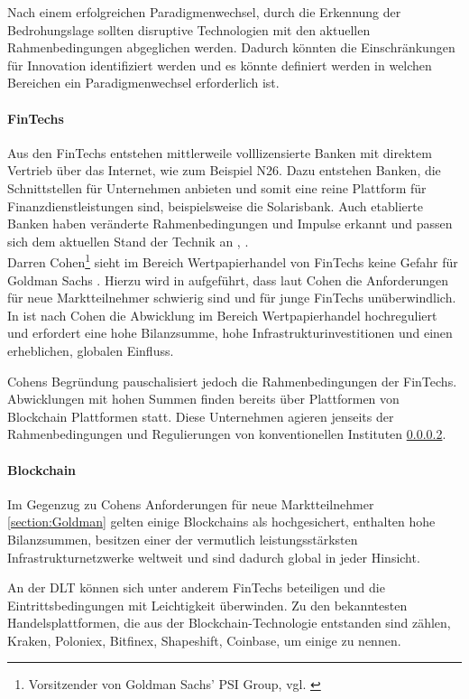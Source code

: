 Nach einem erfolgreichen Paradigmenwechsel, durch die Erkennung der Bedrohungslage sollten disruptive Technologien mit den aktuellen Rahmenbedingungen abgeglichen werden. Dadurch könnten die Einschränkungen für Innovation identifiziert werden und es könnte definiert werden in welchen Bereichen ein Paradigmenwechsel erforderlich ist.

\paragraph{FinTechs}
\label{Disruption:FinTechs}
Aus den FinTechs entstehen mittlerweile volllizensierte Banken mit direktem Vertrieb über das Internet, wie zum Beispiel N26. Dazu entstehen Banken, die Schnittstellen für Unternehmen anbieten und somit eine reine Plattform für Finanzdienstleistungen sind, beispielsweise die Solarisbank. Auch etablierte Banken haben veränderte Rahmenbedingungen und Impulse erkannt und passen sich dem aktuellen Stand der Technik an \cite{Gupta:2017}, \cite{Eismann2015}.
\medskip
\\
Darren Cohen\footnote{Vorsitzender von Goldman Sachs' PSI Group, vgl. \cite{Gupta:2017}} sieht im Bereich Wertpapierhandel von FinTechs keine Gefahr für Goldman Sachs \cite{Gupta:2017}.
Hierzu wird in \cite{Gupta:2017} aufgeführt, dass laut Cohen die Anforderungen für neue Marktteilnehmer schwierig sind und für junge FinTechs unüberwindlich. In \cite{Gupta:2017} ist nach Cohen die Abwicklung im Bereich Wertpapierhandel hochreguliert und erfordert eine hohe Bilanzsumme, hohe Infrastrukturinvestitionen und einen erheblichen, globalen Einfluss.

Cohens Begründung pauschalisiert jedoch die Rahmenbedingungen der FinTechs. Abwicklungen mit hohen Summen finden bereits über Plattformen von Blockchain Plattformen statt. Diese Unternehmen agieren jenseits der Rahmenbedingungen und Regulierungen von konventionellen Instituten \ref{Disruption:Blockchain}.

\paragraph{Blockchain}
\label{Disruption:Blockchain}
Im Gegenzug zu Cohens Anforderungen für neue Marktteilnehmer \ref{section:Goldman} gelten einige Blockchains als hochgesichert, enthalten hohe Bilanzsummen, besitzen einer der vermutlich leistungsstärksten Infrastrukturnetzwerke weltweit und sind dadurch global in jeder Hinsicht.

An der \ac{DLT} können sich unter anderem FinTechs beteiligen und die Eintrittsbedingungen mit Leichtigkeit überwinden. Zu den bekanntesten Handelsplattformen, die aus der Blockchain-Technologie entstanden sind zählen, Kraken, Poloniex, Bitfinex, Shapeshift, Coinbase, um einige zu nennen.

